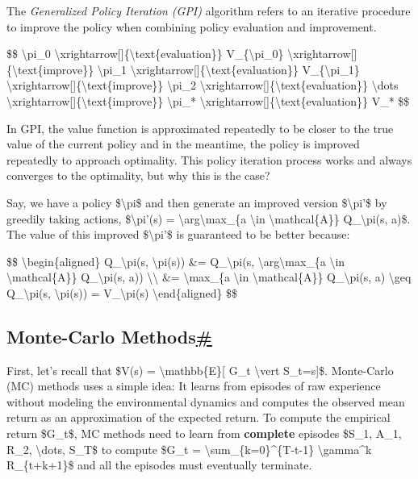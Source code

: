 The \emph{Generalized Policy Iteration (GPI)} algorithm refers to an iterative procedure to improve the policy when combining policy evaluation and improvement.

\$\$ \textbackslash pi\_0 \textbackslash xrightarrow{[}{]}\{\textbackslash text\{evaluation\}\} V\_\{\textbackslash pi\_0\} \textbackslash xrightarrow{[}{]}\{\textbackslash text\{improve\}\} \textbackslash pi\_1 \textbackslash xrightarrow{[}{]}\{\textbackslash text\{evaluation\}\} V\_\{\textbackslash pi\_1\} \textbackslash xrightarrow{[}{]}\{\textbackslash text\{improve\}\} \textbackslash pi\_2 \textbackslash xrightarrow{[}{]}\{\textbackslash text\{evaluation\}\} \textbackslash dots \textbackslash xrightarrow{[}{]}\{\textbackslash text\{improve\}\} \textbackslash pi\_* \textbackslash xrightarrow{[}{]}\{\textbackslash text\{evaluation\}\} V\_* \$\$

In GPI, the value function is approximated repeatedly to be closer to the true value of the current policy and in the meantime, the policy is improved repeatedly to approach optimality. This policy iteration process works and always converges to the optimality, but why this is the case?

Say, we have a policy \$\textbackslash pi\$ and then generate an improved version \$\textbackslash pi'\$ by greedily taking actions, \$\textbackslash pi'(s) = \textbackslash arg\textbackslash max\_\{a \textbackslash in \textbackslash mathcal\{A\}\} Q\_\textbackslash pi(s, a)\$. The value of this improved \$\textbackslash pi'\$ is guaranteed to be better because:

\$\$ \textbackslash begin\{aligned\} Q\_\textbackslash pi(s, \textbackslash pi\textquotesingle(s)) \&= Q\_\textbackslash pi(s, \textbackslash arg\textbackslash max\_\{a \textbackslash in \textbackslash mathcal\{A\}\} Q\_\textbackslash pi(s, a)) \textbackslash\textbackslash{} \&= \textbackslash max\_\{a \textbackslash in \textbackslash mathcal\{A\}\} Q\_\textbackslash pi(s, a) \textbackslash geq Q\_\textbackslash pi(s, \textbackslash pi(s)) = V\_\textbackslash pi(s) \textbackslash end\{aligned\} \$\$

\subsection{\texorpdfstring{Monte-Carlo Methods\hyperref[monte-carlo-methods]{\#}}{Monte-Carlo Methods\#}}\label{monte-carlo-methods}

First, let's recall that \$V(s) = \textbackslash mathbb\{E\}{[} G\_t \textbackslash vert S\_t=s{]}\$. Monte-Carlo (MC) methods uses a simple idea: It learns from episodes of raw experience without modeling the environmental dynamics and computes the observed mean return as an approximation of the expected return. To compute the empirical return \$G\_t\$, MC methods need to learn from {\textbf{complete}} episodes \$S\_1, A\_1, R\_2, \textbackslash dots, S\_T\$ to compute \$G\_t = \textbackslash sum\_\{k=0\}\^{}\{T-t-1\} \textbackslash gamma\^{}k R\_\{t+k+1\}\$ and all the episodes must eventually terminate.

